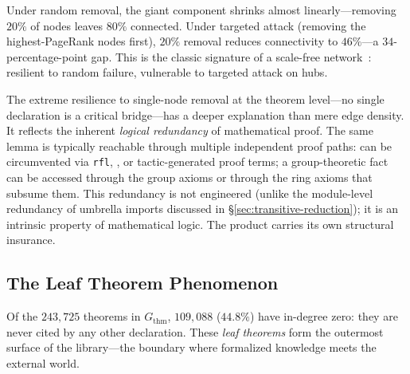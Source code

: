 Under random removal, the giant component shrinks almost linearly---removing $20\%$ of nodes leaves $80\%$ connected. Under targeted attack (removing the highest-PageRank nodes first), $20\%$ removal reduces connectivity to $46\%$---a $34$-percentage-point gap. This is the classic signature of a scale-free network~\cite{albert2000,barabasi1999}: resilient to random failure, vulnerable to targeted attack on hubs.

\begin{remark}
\label{rem:thm-robustness-redundancy}
The extreme resilience to single-node removal at the theorem level---no single declaration is a critical bridge---has a deeper explanation than mere edge density. It reflects the inherent \emph{logical redundancy} of mathematical proof. The same lemma is typically reachable through multiple independent proof paths:  can be circumvented via \texttt{rfl}, , or tactic-generated proof terms; a group-theoretic fact can be accessed through the group axioms or through the ring axioms that subsume them. This redundancy is not engineered (unlike the module-level redundancy of umbrella imports discussed in \S\ref{sec:transitive-reduction}); it is an intrinsic property of mathematical logic. The product carries its own structural insurance.
\end{remark}

\subsection{The Leaf Theorem Phenomenon}
\label{sec:thm-leaves}

Of the $243{,}725$ theorems in $G_{\mathrm{thm}}$, $109{,}088$ ($44.8\%$) have in-degree zero: they are never cited by any other declaration. These \emph{leaf theorems} form the outermost surface of the library---the boundary where formalized knowledge meets the external world.

